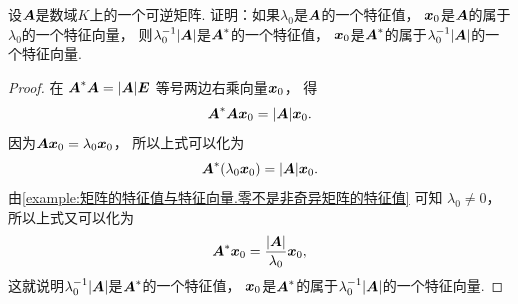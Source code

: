 \begin{example}\label{example:矩阵的特征值与特征向量.伴随矩阵的特征值}
设\(\boldsymbol{A}\)是数域\(K\)上的一个可逆矩阵.
证明：如果\(\lambda_0\)是\(\boldsymbol{A}\)的一个特征值，
\(\boldsymbol{x}_0\)是\(\boldsymbol{A}\)的属于\(\lambda_0\)的一个特征向量，
则\(\lambda_0^{-1} \abs{\boldsymbol{A}}\)是\(\boldsymbol{A}^*\)的一个特征值，
\(\boldsymbol{x}_0\)是\(\boldsymbol{A}^*\)的属于\(\lambda_0^{-1} \abs{\boldsymbol{A}}\)的一个特征向量.
\begin{proof}
在 \hyperref[equation:行列式.伴随矩阵.恒等式1]{\(\boldsymbol{A}^* \boldsymbol{A} = \abs{\boldsymbol{A}} \boldsymbol{E}\)}
等号两边右乘向量\(\boldsymbol{x}_0\)，
得\begin{equation*}
	\boldsymbol{A}^* \boldsymbol{A} \boldsymbol{x}_0
	= \abs{\boldsymbol{A}} \boldsymbol{x}_0.
\end{equation*}
因为\(\boldsymbol{A} \boldsymbol{x}_0 = \lambda_0 \boldsymbol{x}_0\)，
所以上式可以化为\begin{equation*}
	\boldsymbol{A}^* (\lambda_0 \boldsymbol{x}_0)
	= \abs{\boldsymbol{A}} \boldsymbol{x}_0.
\end{equation*}
由\cref{example:矩阵的特征值与特征向量.零不是非奇异矩阵的特征值} 可知
\(\lambda_0 \neq 0\)，
所以上式又可以化为\begin{equation*}
	\boldsymbol{A}^* \boldsymbol{x}_0
	= \frac{\abs{\boldsymbol{A}}}{\lambda_0} \boldsymbol{x}_0,
\end{equation*}
这就说明\(\lambda_0^{-1} \abs{\boldsymbol{A}}\)是\(\boldsymbol{A}^*\)的一个特征值，
\(\boldsymbol{x}_0\)是\(\boldsymbol{A}^*\)的属于\(\lambda_0^{-1} \abs{\boldsymbol{A}}\)的一个特征向量.
\end{proof}
\end{example}

